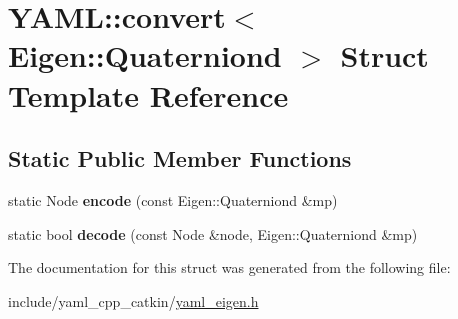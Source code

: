 \hypertarget{structYAML_1_1convert_3_01Eigen_1_1Quaterniond_01_4}{}\section{Y\+A\+ML\+:\+:convert$<$ Eigen\+:\+:Quaterniond $>$ Struct Template Reference}
\label{structYAML_1_1convert_3_01Eigen_1_1Quaterniond_01_4}
\subsection*{Static Public Member Functions}
\begin{DoxyCompactItemize}
\item 
static Node {\bfseries encode} (const Eigen\+::\+Quaterniond \&mp)\hypertarget{structYAML_1_1convert_3_01Eigen_1_1Quaterniond_01_4_a85181ea20e6b7dc21b6daffa53d745ee}{}\label{structYAML_1_1convert_3_01Eigen_1_1Quaterniond_01_4_a85181ea20e6b7dc21b6daffa53d745ee}

\item 
static bool {\bfseries decode} (const Node \&node, Eigen\+::\+Quaterniond \&mp)\hypertarget{structYAML_1_1convert_3_01Eigen_1_1Quaterniond_01_4_add796e15f8e6672ada052f112cbf3f51}{}\label{structYAML_1_1convert_3_01Eigen_1_1Quaterniond_01_4_add796e15f8e6672ada052f112cbf3f51}

\end{DoxyCompactItemize}


The documentation for this struct was generated from the following file\+:\begin{DoxyCompactItemize}
\item 
include/yaml\+\_\+cpp\+\_\+catkin/\hyperlink{yaml__eigen_8h}{yaml\+\_\+eigen.\+h}\end{DoxyCompactItemize}
